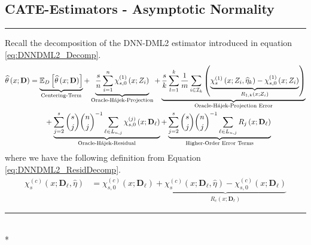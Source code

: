 \subsection{CATE-Estimators - Asymptotic Normality}
\hrule
Recall the decomposition of the DNN-DML2 estimator introduced in equation \ref{eq:DNNDML2_Decomp}.
\begin{equation}
    \begin{aligned}
        \widehat{\theta}\left(x; \mathbf{D}\right)
        & = \underbrace{\mathbb{E}_{D}\left[\widehat{\theta}\left(x; \mathbf{D}\right)\right]}_{\text{Centering-Term}}
        + \underbrace{\frac{s}{n}\sum_{i = 1}^{n} \chi_{s,0}^{(1)}\left(x; Z_{i}\right)}_{\text{Oracle-H\'ajek-Projection}}
        + \underbrace{\frac{s}{k} \sum_{l = 1}^{k} \frac{1}{m} \sum_{i \in \mathcal{I}_{k}}\left(\underbrace{\chi_{s}^{(1)}\left(x; Z_{i}, \widehat{\eta}_{k}\right) - \chi_{s,0}^{(1)}\left(x; Z_{i}\right)}_{R_{1,k}\left(x; Z_{i}\right)}\right)}_{\text{Oracle-H\'ajek-Projection Error}}\\
        & \quad \quad + \underbrace{\sum_{j = 2}^{s} \binom{s}{j} \binom{n}{j}^{-1}\sum_{\ell \in L_{n,j}} \chi_{s,0}^{(j)}\left(x; \mathbf{D}_{\ell}\right)}_{\text{Oracle-H\'ajek-Residual}}
         + \underbrace{\sum_{j = 2}^{s} \binom{s}{j} \binom{n}{j}^{-1}\sum_{\ell \in L_{n,j}} R_{j}\left(x; \mathbf{D}_{\ell}\right)}_{\text{Higher-Order Error Terms}}
    \end{aligned}
\end{equation}
where we have the following definition from Equation \ref{eq:DNNDML2_ResidDecomp}.
\begin{equation}
    \begin{aligned}
        \chi_{s}^{(c)}\left(x; \mathbf{D}_{\ell}, \hat{\eta}\right)
        & = \chi_{s,0}^{(c)}\left(x; \mathbf{D}_{\ell}\right) + \underbrace{\chi_{s}^{(c)}\left(x; \mathbf{D}_{\ell}, \hat{\eta}\right) - \chi_{s,0}^{(c)}\left(x; \mathbf{D}_{\ell}\right)}_{R_{c}\left(x; \mathbf{D}_{\ell}\right)}
    \end{aligned}
\end{equation}

\hrule

\begin{lem}\label{lem:ps_hajek_error}\mbox{}\\*
    
\end{lem}

